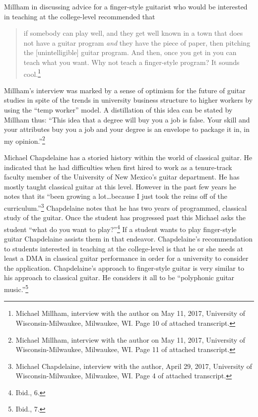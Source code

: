 \documentclass[12pt]{article}
\begin{document}
Millham in discussing advice for a finger-style guitarist who would be
interested in teaching at the college-level recommended that
\begin{quote}
  if somebody can play well, and they get well known in a town that
  does not have a guitar program \emph{and} they have the piece of
  paper, then pitching the [unintelligible] guitar program. And then,
  once you get in you can teach what you want. Why not teach a
  finger-style program? It sounds cool.\footnote{Michael Millham,
    interview with the author on May 11, 2017, University of
    Wisconsin-Milwaukee, Milwaukee, WI. Page 10 of attached
    transcript.}
\end{quote}
Millham's interview was marked by a sense of optimism for the future
of guitar studies in spite of the trends in university business
structure to higher workers by using the ``temp worker'' model. A
distillation of this idea can be stated by Millham thus: ``This idea
that a degree will buy you a job is false. Your skill and your
attributes buy you a job and your degree is an envelope to package it
in, in my opinion.''\footnote{Michael Millham, interview with the
  author on May 11, 2017, University of Wisconsin-Milwaukee,
  Milwaukee, WI. Page 11 of attached transcript.}

Michael Chapdelaine has a storied history within the world of
classical guitar. He indicated that he had difficulties when first
hired to work as a tenure-track faculty member of the University of
New Mexico's guitar department. He has mostly taught classical guitar
at this level. However in the past few years he notes that its ``been
growing a lot…because I just took the reins off of the
curriculum.''\footnote{Michael Chapdelaine, interview with the author,
  April 29, 2017, University of Wisconsin-Milwaukee, Milwaukee,
  WI. Page 4 of attached transcript.} Chapdelaine notes that he has
two years of programmed, classical study of the guitar. Once the
student has progressed past this Michael asks the student ``what do
you want to play?''\footnote{Ibid., 6.} If a student wants to play
finger-style guitar Chapdelaine assists them in that
endeavor. Chapdelaine's recommendation to students interested in
teaching at the college-level is that he or she needs at least a DMA
in classical guitar performance in order for a university to consider
the application. Chapdelaine's approach to finger-style guitar is very
similar to his approach to classical guitar. He considers it all to be
``polyphonic guitar music.''\footnote{Ibid., 7.}
\end{document}
